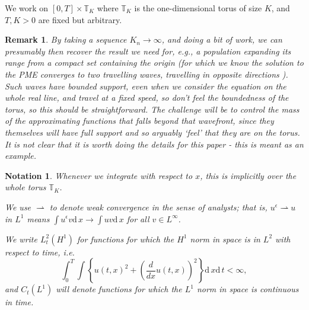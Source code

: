 \documentclass[12pt]{article}
\newtheorem{remark}[theorem]{Remark}
\newtheorem{notation}[theorem]{Notation}
\newcommand{\IT}{\mathbb T}
\newcommand{\dif}{\mathrm{d}\,}
\begin{document}
We work on $[0,T]\times \IT_K$ where $\IT_K$ is the one-dimensional
torus of size $K$, and $T,K>0$ are fixed but arbitrary.

\begin{remark}
By taking a sequence $K_n\to\infty$, and doing a bit of work,
we can presumably then recover the result
we need for, e.g., a population expanding its range from a compact
set containing the origin (for which we know the solution to the PME
converges to two travelling waves, travelling in opposite directions
\cite{kamin/rosenau:2004}). Such waves have bounded support, even when
we consider the equation on
the whole real line, and travel at a fixed speed, so don't feel the boundedness
of the torus,
so this should be straightforward. The challenge will be to control the
mass of the approximating functions that falls beyond that wavefront,
since they themselves will have full support and so arguably `feel' that they
are on the torus.
It is not clear that it is worth doing the details for this paper - this is
meant as an example.
\end{remark}

\begin{notation}

Whenever we integrate with respect to $x$, this is implicitly over the
whole torus $\IT_K$.

We use $\rightharpoonup$ to denote weak convergence in the sense of analysts;
that is, $u^\epsilon\rightharpoonup u$ in $L^1$ means $\int u^\epsilon v \dif x
\rightarrow\int uv\dif x$ for all $v\in L^\infty$.

We write $L_t^2(H^1)$ for functions for which the $H^1$ norm in
space is in $L^2$ with respect to time, i.e.
$$\int_0^T\int \left\{u(t,x)^2+\left(\frac{d}{dx} u(t,x)\right)^2\right\} \dif x \dif t <\infty,$$
and $C_t(L^1)$
will denote functions for which the $L^1$ norm in space is continuous in time.
\end{notation}
\end{document}
